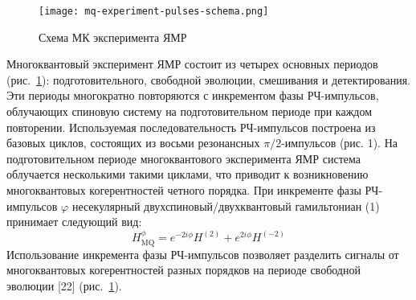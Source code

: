 %
%
%
\begin{figure}
  \centering
  \texttt{[image: mq-experiment-pulses-schema.png]}
  \caption{Схема МК эксперимента ЯМР}
  \label{fig:mq-experiment-pulses-schema}
\end{figure}

Многоквантовый эксперимент ЯМР состоит из четырех основных периодов (рис.~\ref{fig:mq-experiment-pulses-schema}): подготовительного, свободной эволюции, смешивания и детектирования.
Эти периоды многократно повторяются с инкрементом фазы РЧ-импульсов, облучающих спиновую систему на подготовительном периоде при каждом повторении. Используемая последовательность РЧ-импульсов построена из базовых циклов, состоящих из восьми резонансных $\pi/2$-импульсов (рис. 1).
На подготовительном периоде многоквантового эксперимента ЯМР
система облучается несколькими такими циклами,
что приводит к возникновению многоквантовых когерентностей четного порядка.
При инкременте фазы РЧ-импульсов $\varphi$ несекулярный двухспиновый/двухквантовый гамильтониан (1) принимает следующий вид:
%
\begin{equation}\label{eq:hmq-phased}
    H_\mathrm{MQ}^{\phi} = e^{-2i\phi}H^{(2)} + e^{2i\phi}H^{(-2)}
\end{equation}
%
Использование инкремента фазы РЧ-импульсов позволяет разделить сигналы от многоквантовых когерентностей разных порядков на периоде свободной эволюции [22] (рис.~\ref{fig:mq-experiment-pulses-schema}).

